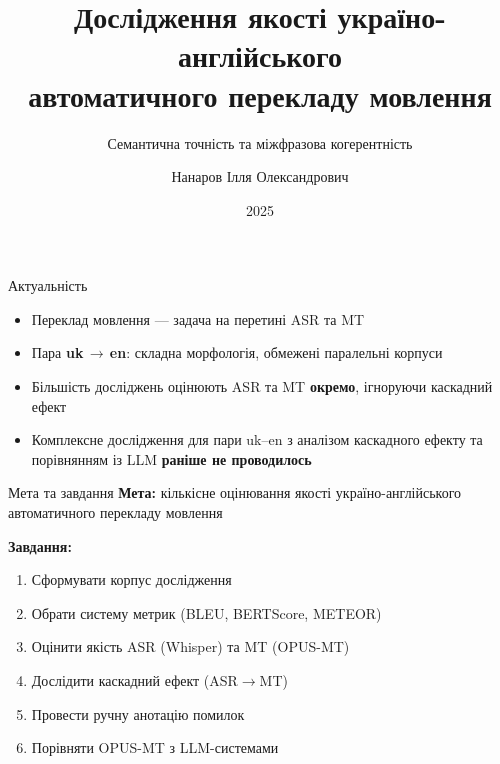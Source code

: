 \documentclass[aspectratio=169]{beamer}
\title{Дослідження якості україно-англійського\\автоматичного перекладу мовлення}
\subtitle{Семантична точність та міжфразова когерентність}
\author{Нанаров Ілля Олександрович}
\institute{НаУКМА, факультет інформатики\\Кафедра математики\\[0.3em]
Керівник: Іванюк А.\,О.}
\date{2025}
\begin{document}
\begin{frame}
\titlepage
\end{frame}

\begin{frame}{Актуальність}
\begin{itemize}
    \item Переклад мовлення --- задача на перетині ASR та MT
    \item Пара \textbf{uk\,$\to$\,en}: складна морфологія, обмежені паралельні корпуси
    \item Більшість досліджень оцінюють ASR та MT \textbf{окремо}, ігноруючи каскадний ефект
    \item Комплексне дослідження для пари uk--en з аналізом каскадного ефекту та порівнянням із LLM \textbf{раніше не проводилось}
\end{itemize}
\end{frame}

\begin{frame}{Мета та завдання}
\textbf{Мета:} кількісне оцінювання якості україно-англійського автоматичного перекладу мовлення

\vspace{0.5em}
\textbf{Завдання:}
\begin{enumerate}
    \item Сформувати корпус дослідження
    \item Обрати систему метрик (BLEU, BERTScore, METEOR)
    \item Оцінити якість ASR (Whisper) та MT (OPUS-MT)
    \item Дослідити каскадний ефект (ASR$\to$MT)
    \item Провести ручну анотацію помилок
    \item Порівняти OPUS-MT з LLM-системами
\end{enumerate}
\end{frame}
\end{document}

